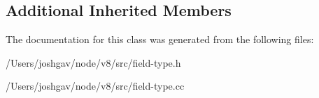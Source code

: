 \subsection*{Additional Inherited Members}


The documentation for this class was generated from the following files\+:\begin{DoxyCompactItemize}
\item 
/\+Users/joshgav/node/v8/src/field-\/type.\+h\item 
/\+Users/joshgav/node/v8/src/field-\/type.\+cc\end{DoxyCompactItemize}

